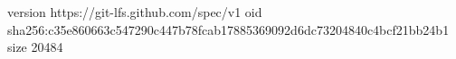 version https://git-lfs.github.com/spec/v1
oid sha256:c35e860663c547290c447b78fcab17885369092d6dc73204840c4bcf21bb24b1
size 20484
